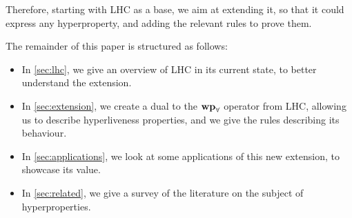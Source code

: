 Therefore, starting with LHC as a base, we aim at extending it, so that it could express any hyperproperty, and adding the relevant rules to prove them.

The remainder of this paper is structured as follows:

\begin{itemize}
    \item In \cref{sec:lhc}, we give an overview of LHC in its current state, to better understand the extension.
    \item In \cref{sec:extension}, we create a dual to the $\mathbf{wp}_{\forall}$ operator from LHC, allowing us to describe hyperliveness properties, and we give the rules describing its behaviour.
    \item In \cref{sec:applications}, we look at some applications of this new extension, to showcase its value.
    \item In \cref{sec:related}, we give a survey of the literature on the subject of hyperproperties.
\end{itemize}
